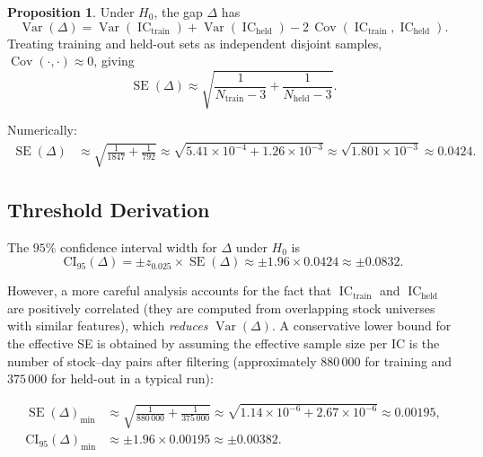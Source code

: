 \documentclass[11pt,a4paper]{article}
\theoremstyle{definition}
\newtheorem{proposition}{Proposition}[section]
\newcommand{\IC}{\operatorname{IC}}
\newcommand{\Var}{\operatorname{Var}}
\newcommand{\Cov}{\operatorname{Cov}}
\newcommand{\SE}{\operatorname{SE}}
\newcommand{\Ho}{H_{0}}
\begin{document}
\begin{proposition}
    Under $\Ho$, the gap $\Delta$ has
    \begin{equation}
        \Var(\Delta) = \Var(\IC_{\text{train}}) + \Var(\IC_{\text{held}})
                     - 2\,\Cov(\IC_{\text{train}}, \IC_{\text{held}}).
        \label{eq:gap_var}
    \end{equation}
    Treating training and held-out sets as independent disjoint samples,
    $\Cov(\cdot,\cdot) \approx 0$, giving
    \begin{equation}
        \SE(\Delta) \approx \sqrt{\frac{1}{N_{\text{train}}-3}
                                 + \frac{1}{N_{\text{held}}-3}}.
        \label{eq:gap_se}
    \end{equation}
\end{proposition}

Numerically:
\begin{align}
    \SE(\Delta) &\approx \sqrt{\frac{1}{1847} + \frac{1}{792}}
                 \approx \sqrt{5.41\!\times\!10^{-4} + 1.26\!\times\!10^{-3}}
                 \approx \sqrt{1.801\!\times\!10^{-3}} \approx 0.0424.
\end{align}

\subsection{Threshold Derivation}

The $95\%$ confidence interval width for $\Delta$ under $\Ho$ is
\begin{equation}
    \text{CI}_{95}(\Delta) = \pm z_{0.025} \times \SE(\Delta)
                           \approx \pm 1.96 \times 0.0424 \approx \pm 0.0832.
\end{equation}

However, a more careful analysis accounts for the fact that
$\IC_{\text{train}}$ and $\IC_{\text{held}}$ are positively correlated
(they are computed from overlapping stock universes with similar features),
which \emph{reduces} $\Var(\Delta)$.  A conservative lower bound for the
effective SE is obtained by assuming the effective sample size per IC is
the number of stock--day pairs after filtering (approximately $880\,000$ for
training and $375\,000$ for held-out in a typical run):

\begin{align}
    \SE(\Delta)_{\text{min}} &\approx
        \sqrt{\frac{1}{880\,000} + \frac{1}{375\,000}}
        \approx \sqrt{1.14\!\times\!10^{-6} + 2.67\!\times\!10^{-6}}
        \approx 0.00195, \\[4pt]
    \text{CI}_{95}(\Delta)_{\text{min}} &\approx \pm 1.96 \times 0.00195
                                         \approx \pm 0.00382.
\end{align}
\end{document}
